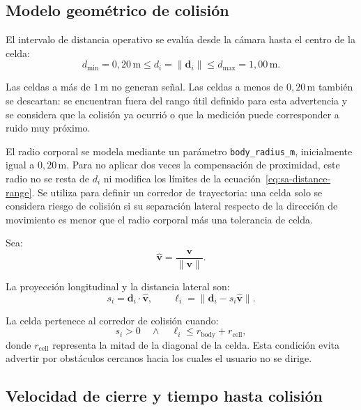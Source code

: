 \subsection{Modelo geométrico de colisión}
\label{subsec:sa-collision-model}

El intervalo de distancia operativo se evalúa desde la cámara hasta el centro
de la celda:
%
\begin{equation}
  \label{eq:sa-distance-range}
  d_{\min}=0{,}20\,\text{m}
  \leq d_i = \|\mathbf{d}_i\|
  \leq d_{\max}=1{,}00\,\text{m}.
\end{equation}

Las celdas a más de $1\,\text{m}$ no generan señal. Las celdas a menos de
$0{,}20\,\text{m}$ también se descartan: se encuentran fuera del rango útil
definido para esta advertencia y se considera que la colisión ya ocurrió o
que la medición puede corresponder a ruido muy próximo.

El radio corporal se modela mediante un parámetro
\texttt{body\_radius\_m}, inicialmente igual a $0{,}20\,\text{m}$. Para no
aplicar dos veces la compensación de proximidad, este radio no se resta de
$d_i$ ni modifica los límites de la ecuación~\ref{eq:sa-distance-range}. Se
utiliza para definir un corredor de trayectoria: una celda solo se considera
riesgo de colisión si su separación lateral respecto de la dirección de
movimiento es menor que el radio corporal más una tolerancia de celda.

Sea:
%
\begin{equation}
  \mathbf{\hat v} =
  \frac{\mathbf{v}}{\|\mathbf{v}\|}.
\end{equation}

La proyección longitudinal y la distancia lateral son:
%
\begin{equation}
  \label{eq:sa-corridor}
  s_i = \mathbf{d}_i\cdot\mathbf{\hat v},
  \qquad
  \ell_i =
  \left\|
    \mathbf{d}_i-s_i\mathbf{\hat v}
  \right\|.
\end{equation}

La celda pertenece al corredor de colisión cuando:
%
\begin{equation}
  \label{eq:sa-corridor-condition}
  s_i > 0
  \quad\land\quad
  \ell_i \leq r_{\text{body}} + r_{\text{cell}},
\end{equation}
%
donde $r_{\text{cell}}$ representa la mitad de la diagonal de la celda. Esta
condición evita advertir por obstáculos cercanos hacia los cuales el usuario
no se dirige.

\subsection{Velocidad de cierre y tiempo hasta colisión}
\label{subsec:sa-ttc}

